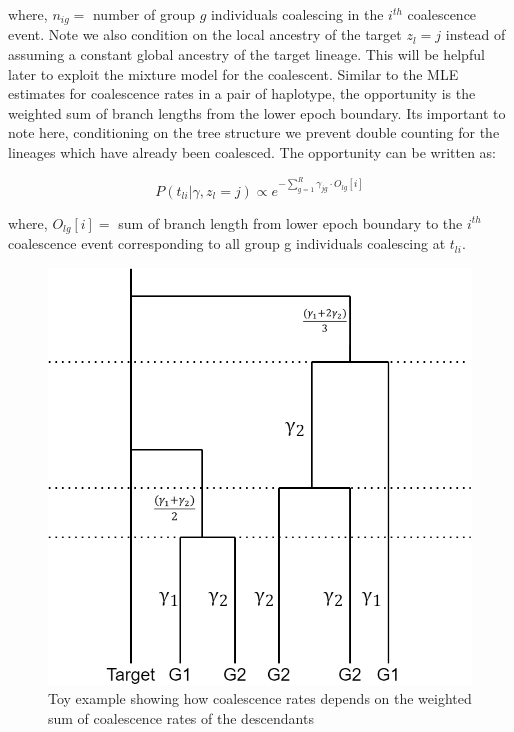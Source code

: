 where, $n_{ig} =$  number of group $g$ individuals coalescing in the $i^{th}$ coalescence event. Note we also condition on the local ancestry of the target $z_l = j$ instead of assuming a constant global ancestry of the target lineage. This will be helpful later to exploit the mixture model for the coalescent. Similar to the MLE estimates for coalescence rates in a pair of haplotype, the opportunity is the weighted sum of branch lengths from the lower epoch boundary. Its important to note here, conditioning on the tree structure we prevent double counting for the lineages which have already been coalesced. The opportunity can be written as: 

\begin{equation}
P(t_{li} | \gamma, z_l = j)  \propto e^{-\sum_{g=1}^R \gamma_{jg} \cdot O_{lg}[i]}
\end{equation}

where, $O_{lg}[i] =$ sum of branch length from lower epoch boundary to the $i^{th}$ coalescence event corresponding to all group g individuals coalescing at $t_{li}$.

\begin{figure}[h!]
    \centering
    \includegraphics[scale=0.275]{figures/ghost buster simon myers-Page-1.png}
    \caption{Toy example showing how coalescence rates depends on the weighted sum of coalescence rates of the descendants}
    \label{fig1}
\end{figure}

